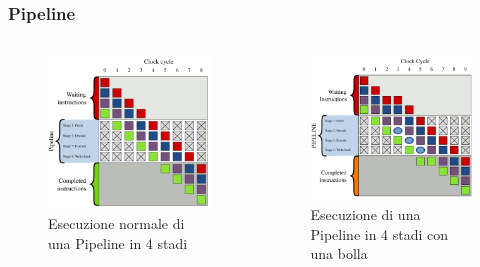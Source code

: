 \begin{frame}
	\frametitle{ Pipeline}
	 
	\begin{columns}
		\begin{figure}[!htbp]
			\centering 
			\includegraphics[width=1.0\linewidth]{images/7_pipeline/pipeline_4_stage.pdf}
			\caption{Esecuzione normale di una Pipeline in 4 stadi}
			\label{fig:pipeline_4_stage}
		\end{figure}
			
		\begin{figure}[!htbp]
			\centering 
			\includegraphics[width=1.0\linewidth]{images/7_pipeline/pipeline_4_stage_with_bubble.pdf}
			\caption{Esecuzione di una Pipeline in 4 stadi con una bolla}
			\label{fig:pipeline_4_stage_with_bubble}
		\end{figure}
	\end{columns}
	
\end{frame}


